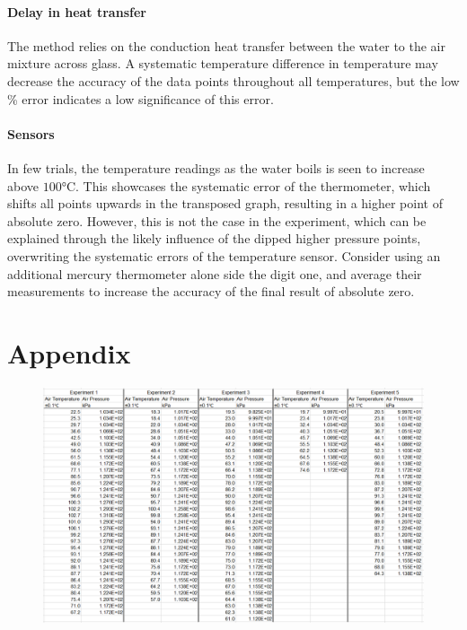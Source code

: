 \documentclass[a4paper,12pt]{article}
\begin{document}
\paragraph{Delay in heat transfer}
The method relies on the conduction heat transfer between the water to the air mixture across glass. A systematic temperature difference in temperature may decrease the accuracy of the data points throughout all temperatures, but the low \% error indicates a low significance of this error.

\paragraph{Sensors}
In few trials, the temperature readings as the water boils is seen to increase above $100\si{\celsius}$. This showcases the systematic error of the thermometer, which shifts all points upwards in the transposed graph, resulting in a higher point of absolute zero. However, this is not the case in the experiment, which can be explained through the likely influence of the dipped higher pressure points, overwriting the systematic errors of the temperature sensor. Consider using an additional mercury thermometer alone side the digit one, and average their measurements to increase the accuracy of the final result of absolute zero.

\newpage
\nocite{*}
\printbibliography


\newpage
\section*{Appendix}
\appendix
\begin{figure}[H]
    \centering
    \includegraphics[width=\textwidth]{assets/unitdata.png}
    \label{fig:pq}
\end{figure}
\end{document}
